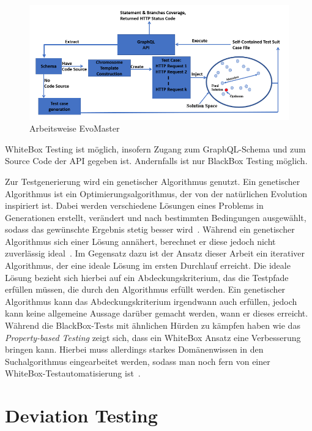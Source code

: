\begin{figure}
    \centering
    \includegraphics[width=\textwidth,height=\textheight,keepaspectratio]{content/hauptteil/relatedWork/evomaster_framework}
    \caption{Arbeitsweise EvoMaster}
    \label{evomast}
\end{figure}

WhiteBox Testing ist möglich, insofern Zugang zum GraphQL-Schema und zum Source Code der API gegeben ist.
Andernfalls ist nur BlackBox Testing möglich.


Zur Testgenerierung wird ein genetischer Algorithmus genutzt.
Ein genetischer Algorithmus ist ein Optimierungsalgorithmus, der von der natürlichen Evolution inspiriert ist.
Dabei werden verschiedene Lösungen eines Problems in Generationen erstellt, verändert und nach bestimmten Bedingungen ausgewählt,
sodass das gewünschte Ergebnis stetig besser wird~\cite[vgl.]{genalgo}.
Während ein genetischer Algorithmus sich einer Lösung annähert, berechnet er diese jedoch nicht zuverlässig ideal~\cite[vgl. Fazit]{genalgo}.
Im Gegensatz dazu ist der Ansatz dieser Arbeit ein iterativer Algorithmus, der eine ideale Lösung im ersten Durchlauf erreicht.
Die ideale Lösung bezieht sich hierbei auf ein Abdeckungskriterium, das die Testpfade erfüllen müssen, die durch den Algorithmus erfüllt werden.
Ein genetischer Algorithmus kann das Abdeckungskriterium irgendwann auch erfüllen, jedoch kann keine allgemeine Aussage darüber gemacht werden, wann er dieses erreicht.
Während die BlackBox-Tests mit ähnlichen Hürden zu kämpfen haben wie das \textit{Property-based Testing} zeigt sich, dass ein WhiteBox
Ansatz eine Verbesserung bringen kann.
Hierbei muss allerdings starkes Domänenwissen in den Suchalgorithmus eingearbeitet werden, sodass man noch fern von einer WhiteBox-Testautomatisierung ist~\cite[vgl. Discussion and Future Directions]{belhadi2022whitebox}.

\section{Deviation Testing}

